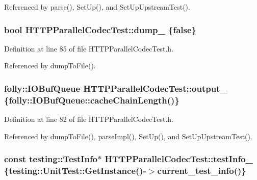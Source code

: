 Referenced by parse(), Set\+Up(), and Set\+Up\+Upstream\+Test().

\subsubsection[{dump\+\_\+}]{\setlength{\rightskip}{0pt plus 5cm}bool H\+T\+T\+P\+Parallel\+Codec\+Test\+::dump\+\_\+ \{false\}\hspace{0.3cm}{\ttfamily [protected]}}\label{classHTTPParallelCodecTest_a36058b53d23815e52ba931e37742b819}


Definition at line 85 of file H\+T\+T\+P\+Parallel\+Codec\+Test.\+h.



Referenced by dump\+To\+File().

\subsubsection[{output\+\_\+}]{\setlength{\rightskip}{0pt plus 5cm}folly\+::\+I\+O\+Buf\+Queue H\+T\+T\+P\+Parallel\+Codec\+Test\+::output\+\_\+ \{folly\+::\+I\+O\+Buf\+Queue\+::cache\+Chain\+Length()\}\hspace{0.3cm}{\ttfamily [protected]}}\label{classHTTPParallelCodecTest_abc6a9252e2047410626f9ce5191fc382}


Definition at line 82 of file H\+T\+T\+P\+Parallel\+Codec\+Test.\+h.



Referenced by dump\+To\+File(), parse\+Impl(), Set\+Up(), and Set\+Up\+Upstream\+Test().

\subsubsection[{test\+Info\+\_\+}]{\setlength{\rightskip}{0pt plus 5cm}const testing\+::\+Test\+Info$\ast$ H\+T\+T\+P\+Parallel\+Codec\+Test\+::test\+Info\+\_\+ \{testing\+::\+Unit\+Test\+::\+Get\+Instance()-\/$>$current\+\_\+test\+\_\+info()\}\hspace{0.3cm}{\ttfamily [protected]}}\label{classHTTPParallelCodecTest_a96450fe0e5c806862bfbdb46693e46ed}


